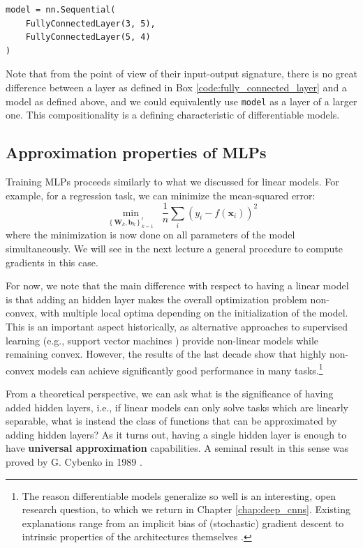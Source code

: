 \vspace{1em}
{\begin{center}\footnotesize
\begin{verbatim}
model = nn.Sequential(
    FullyConnectedLayer(3, 5), 
    FullyConnectedLayer(5, 4)
)
\end{verbatim}
\end{center}}
 
Note that from the point of view of their input-output signature, there is no great difference between a layer as defined in Box \ref{code:fully_connected_layer} and a model as defined above, and we could equivalently use \texttt{model} as a layer of a larger one. This compositionality is a defining characteristic of differentiable models.

\subsection{Approximation properties of MLPs} \addteacup

Training MLPs proceeds similarly to what we discussed for linear models. For example, for a regression task, we can minimize the mean-squared error:
%
$$
\underset{\left\{\mathbf{W}_k, \mathbf{b}_k\right\}_{k=1}^l}{\min} \;\; \frac{1}{n}\sum_{i} \left(y_i - f(\mathbf{x}_i)\right)^2
$$
%
where the minimization is now done on all parameters of the model simultaneously. We will see in the next lecture a general procedure to compute gradients in this case. 

For now, we note that the main difference with respect to having a linear model is that adding an hidden layer makes the overall optimization problem non-convex, with multiple local optima depending on the initialization of the model. This is an important aspect historically, as alternative approaches to supervised learning (e.g., support vector machines \cite{hofmann2008kernel}) provide non-linear models while remaining convex. However, the results of the last decade show that highly non-convex models can achieve significantly good performance in many tasks.\footnote{The reason differentiable models generalize so well is an interesting, open research question, to which we return in Chapter \ref{chap:deep_cnns}. Existing explanations range from an implicit bias of (stochastic) gradient descent \cite{pesme2021implicit} to intrinsic properties of the architectures themselves \cite{arpit2017closer,teney2024neural}.}

From a theoretical perspective, we can ask what is the significance of having added hidden layers, i.e., if linear models can only solve tasks which are linearly separable, what is instead the class of functions that can be approximated by adding hidden layers? As it turns out, having a single hidden layer is enough to have \textbf{universal approximation} capabilities. A seminal result in this sense was proved by G. Cybenko in 1989 \cite{cybenko1989approximation}.

